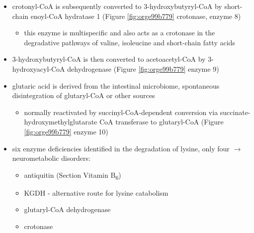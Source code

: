\documentclass[12pt]{scrartcl}
\begin{document}
\begin{center}
\begin{center}
\begin{itemize}
\begin{itemize}
\begin{itemize}
\end{itemize}
\end{itemize}
\item crotonyl-CoA is subsequently converted to 3-hydroxybutyryl-CoA by
short-chain enoyl-CoA hydratase 1 (Figure \ref{fig:orge99b779} crotonase, enzyme 8)
\begin{itemize}
\item this enzyme is multispecific and also acts as a crotonase in the
degradative pathways of valine, isoleucine and short-chain fatty
acids
\end{itemize}
\item 3-hydroxybutyryl-CoA is then converted to acetoacetyl-CoA by
3-hydroxyacyl-CoA dehydrogenase (Figure \ref{fig:orge99b779} enzyme 9)
\item glutaric acid is derived from the intestinal microbiome, spontaneous
disintegration of glutaryl-CoA or other sources
\begin{itemize}
\item normally reactivated by succinyl-CoA-dependent conversion via
succinate-hydroxymethylglutarate CoA transferase to glutaryl-CoA
(Figure \ref{fig:orge99b779} enzyme 10)
\end{itemize}

\item six enzyme deficiencies identified in the degradation of lysine,
only four \(\to\) neurometabolic disorders:
\begin{itemize}
\item antiquitin (Section Vitamin B\textsubscript{6})
\item KGDH - alternative route for lysine catabolism
\item glutaryl-CoA dehydrogenase
\item crotonase
\end{itemize}
\end{itemize}


\end{center}
\end{center}
\end{document}
